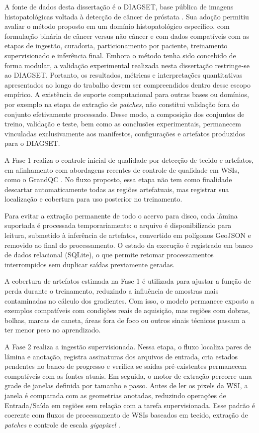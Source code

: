 A fonte de dados desta dissertação é o DIAGSET, base pública de imagens histopatológicas voltada à detecção de câncer de próstata \cite{koziarski2024diagset}. Sua adoção permitiu avaliar o método proposto em um domínio histopatológico específico, com formulação binária de câncer versus não câncer e com dados compatíveis com as etapas de ingestão, curadoria, particionamento por paciente, treinamento supervisionado e inferência final. Embora o método tenha sido concebido de forma modular, a validação experimental realizada nesta dissertação restringe-se ao DIAGSET. Portanto, os resultados, métricas e interpretações quantitativas apresentados ao longo do trabalho devem ser compreendidos dentro desse escopo empírico. A existência de suporte computacional para outras bases ou domínios, por exemplo na etapa de extração de \textit{patches}, não constitui validação fora do conjunto efetivamente processado. Desse modo, a composição dos conjuntos de treino, validação e teste, bem como as conclusões experimentais, permanecem vinculadas exclusivamente aos manifestos, configurações e artefatos produzidos para o DIAGSET.

A Fase 1 realiza o controle inicial de qualidade por detecção de tecido e
artefatos, em alinhamento com abordagens recentes de controle de qualidade em
WSIs, como o GrandQC \cite{weng2024grandqc}. No fluxo proposto, essa etapa não
tem como finalidade descartar automaticamente todas as regiões artefatuais, mas
registrar sua localização e cobertura para uso posterior no treinamento.

Para evitar a extração permanente de todo o acervo para disco, cada lâmina
suportada é processada temporariamente: o arquivo é disponibilizado para leitura,
submetido à inferência de artefatos, convertido em polígonos GeoJSON e removido
ao final do processamento. O estado da execução é registrado em banco de dados relacional (SQLite), o que
permite retomar processamentos interrompidos sem duplicar saídas previamente
geradas.

A cobertura de artefatos estimada na Fase 1 é utilizada para ajustar a função de
perda durante o treinamento, reduzindo a influência de amostras mais contaminadas
no cálculo dos gradientes. Com isso, o modelo permanece exposto a exemplos
compatíveis com condições reais de aquisição, mas regiões com dobras, bolhas,
marcas de caneta, áreas fora de foco ou outros sinais técnicos passam a ter menor
peso no aprendizado.

A Fase 2 realiza a ingestão supervisionada. Nessa etapa, o fluxo localiza pares
de lâmina e anotação, registra assinaturas dos arquivos de entrada, cria estados
pendentes no banco de progresso e verifica se saídas pré-existentes permanecem
compatíveis com as fontes atuais. Em seguida, o motor de extração percorre uma
grade de janelas definida por tamanho e passo. Antes de ler os pixels da WSI, a
janela é comparada com as geometrias anotadas, reduzindo operações de Entrada/Saída em
regiões sem relação com a tarefa supervisionada. Esse padrão é coerente com
fluxos de processamento de WSIs baseados em tecido, extração de \textit{patches}
e controle de escala \textit{gigapixel}
\cite{munozaguirre2020pyhist,khened2021generalized,bandi2019resolution}.

